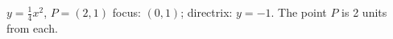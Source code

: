 {$y=\frac14x^2$, $P=(2,1)$
}
{focus: $(0,1)$; directrix: $y=-1$. The point $P$ is 2 units from each.
}
